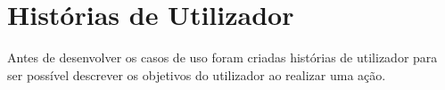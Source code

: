 \section{Histórias de Utilizador}
Antes de desenvolver os casos de uso foram criadas histórias de utilizador para ser possível descrever 
os objetivos do utilizador ao realizar uma ação.

